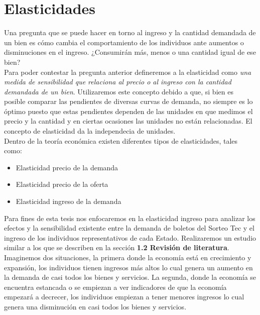 \newpage


\section{Elasticidades}
\noindent Una pregunta que se puede hacer en torno al ingreso y la cantidad demandada de un bien es cómo cambia el comportamiento de los individuos ante aumentos o disminuciones en el ingreso. ¿Consumirán más, menos o una cantidad igual de ese bien? \\

Para poder contestar la pregunta anterior defineremos a la elasticidad como \textit{una medida de sensibilidad que relaciona al precio o al ingreso con la cantidad demandada de un bien}. Utilizaremos este concepto debido a que, si bien es posible comparar las pendientes de diversas curvas de demanda, no siempre es lo óptimo puesto que estas pendientes dependen de las unidades en que medimos el precio y la cantidad y en ciertas ocasiones las unidades no están relacionadas. El concepto de elasticidad da la independecia de unidades. \\ 

Dentro de la teoría económica existen diferentes tipos de elasticidades, tales como: 

\begin{itemize}
    \item Elasticidad precio de la demanda
    \item Elasticidad precio de la oferta
    \item Elasticidad ingreso de la demanda
\end{itemize}

Para fines de esta tesis nos enfocaremos en la elasticidad ingreso para analizar los efectos y la sensibilidad existente entre la demanda de boletos del Sorteo Tec y el ingreso de los individuos representativos de cada Estado. Realizaremos un estudio similar a los que se describen en la sección \textbf{1.2 Revisión de literatura}. \\ 

Imaginemos dos situaciones, la primera donde la economía está en crecimiento y expansión, los individuos tienen ingresos más altos lo cual genera un aumento en la demanda de casi todos los bienes y servicios. La segunda, donde la economía se encuentra estancada o se empiezan a ver indicadores de que la economía empezará a decrecer, los individuos empiezan a tener menores ingresos lo cual genera una disminución en casi todos los bienes y servicios. \\

